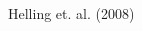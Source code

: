 \documentclass[14pt]{beamer}
\newcommand*\figcite[1]{\vspace*{\fill}\raggedleft\footnotesize{#1}}
\begin{document}
\begin{frame}
\begin{columnsonlytextwidth}
\begin{column}{0.6\textwidth}
    \end{column}
  \end{columnsonlytextwidth}
  \figcite{Helling et. al. (2008)}
\end{frame}
\end{document}
